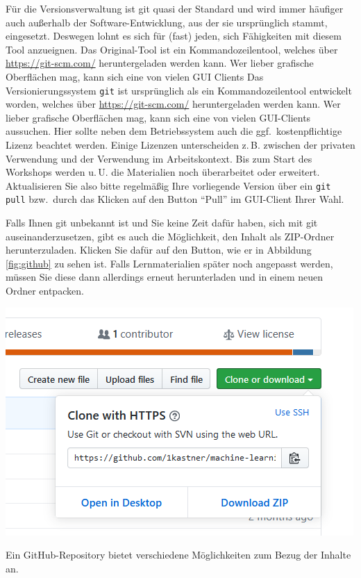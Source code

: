 \documentclass{tufte-handout}
\begin{document}
Für die Versionsverwaltung ist git quasi der Standard und wird immer häufiger auch außerhalb der Software-Entwicklung, aus der sie ursprünglich stammt, eingesetzt.
Deswegen lohnt es sich für (fast) jeden, sich Fähigkeiten mit diesem Tool anzueignen.
Das Original-Tool ist ein Kommandozeilentool, welches über \url{https://git-scm.com/} heruntergeladen werden kann.
Wer lieber grafische Oberflächen mag, kann sich eine von vielen GUI Clients%
Das Versionierungssystem \texttt{git} ist ursprünglich als ein Kommandozeilentool entwickelt worden, welches über \url{https://git-scm.com/} heruntergeladen werden kann.
Wer lieber grafische Oberflächen mag, kann sich eine von vielen GUI-Clients%
aussuchen.
Hier sollte neben dem Betriebssystem auch die ggf.\ kostenpflichtige Lizenz beachtet werden.
Einige Lizenzen unterscheiden z.\,B. zwischen der privaten Verwendung und der Verwendung im Arbeitskontext.
Bis zum Start des Workshops werden u.\,U. die Materialien noch überarbeitet oder erweitert.
Aktualisieren Sie also bitte regelmäßig Ihre vorliegende Version über ein \texttt{git pull} bzw.\ durch das Klicken auf den Button \enquote{Pull} im GUI-Client Ihrer Wahl.

Falls Ihnen git unbekannt ist und Sie keine Zeit dafür haben, sich mit git auseinanderzusetzen, gibt es auch die Möglichkeit, den Inhalt als ZIP-Ordner herunterzuladen.
Klicken Sie dafür auf den Button, wie er in Abbildung\,\ref{fig:github} zu sehen ist.
Falls Lernmaterialien später noch angepasst werden, müssen Sie diese dann allerdings erneut herunterladen und in einem neuen Ordner entpacken.

\begin{marginfigure}
  \includegraphics{github-zip}
  \caption{Ein GitHub-Repository bietet verschiedene Möglichkeiten zum Bezug der Inhalte an.}%
\label{fig:github}
\end{marginfigure}
\end{document}
